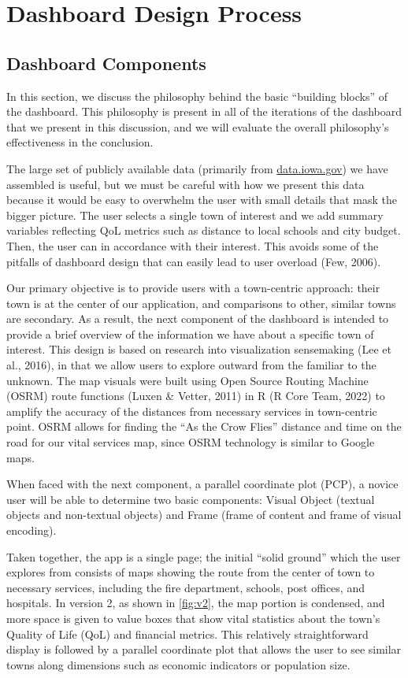 \documentclass[print]{nuthesis}
\begin{document}
\section{ Dashboard Design Process}

\subsection{Dashboard Components }

In this section, we discuss the philosophy behind the basic ``building blocks'' of the dashboard. This philosophy is present in all of the iterations of the dashboard that we present in this discussion, and we will evaluate the overall philosophy's effectiveness in the conclusion.

The large set of publicly available data (primarily from \url{data.iowa.gov}) we have assembled is useful, but we must be careful with how we present this data because it would be easy to overwhelm the user with small details that mask the bigger picture. The user selects a single town of interest and we add summary variables reflecting QoL metrics such as distance to local schools and city budget. Then, the user can in accordance with their interest. This avoids some of the pitfalls of dashboard design that can easily lead to user overload (Few, 2006).

Our primary objective is to provide users with a town-centric approach: their town is at the center of our application, and comparisons to other, similar towns are secondary. As a result, the next component of the dashboard is intended to provide a brief overview of the information we have about a specific town of interest. This design is based on research into visualization sensemaking (Lee et al., 2016), in that we allow users to explore outward from the familiar to the unknown. The map visuals were built using Open Source Routing Machine (OSRM) route functions (Luxen \& Vetter, 2011) in R (R Core Team, 2022) to amplify the accuracy of the distances from necessary services in town-centric point. OSRM allows for finding the ``As the Crow Flies'' distance and time on the road for our vital services map, since OSRM technology is similar to Google maps.

When faced with the next component, a parallel coordinate plot (PCP), a novice user will be able to determine two basic components: Visual Object (textual objects and non-textual objects) and Frame (frame of content and frame of visual encoding).

Taken together, the app is a single page; the initial ``solid ground'' which the user explores from consists of maps showing the route from the center of town to necessary services, including the fire department, schools, post offices, and hospitals. In version 2, as shown in \autoref{fig:v2}, the map portion is condensed, and more space is given to value boxes that show vital statistics about the town's Quality of Life (QoL) and financial metrics. This relatively straightforward display is followed by a parallel coordinate plot that allows the user to see similar towns along dimensions such as economic indicators or population size.
\end{document}
